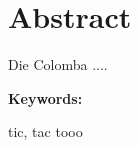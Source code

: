 \section*{Abstract}
Die Colomba ....

\vspace{2ex}

\textbf{Keywords:}

tic, tac tooo

\clearpage



